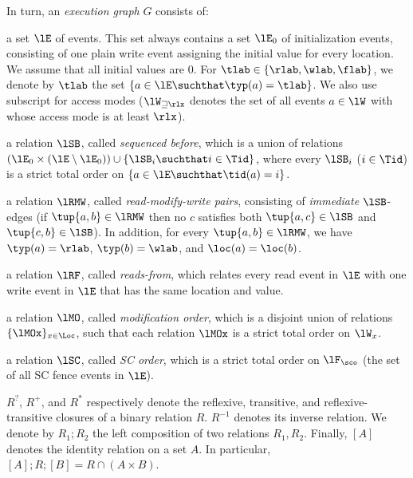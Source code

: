 In turn, an \emph{execution graph} $G$  consists of:
\squishlist
\item a set $\lE$ of events.
This set always contains a set $\lE_0$ of initialization events,
consisting of one plain write event assigning the initial value for every location.
We assume that all initial values are $0$.
For $\tlab\in\{\rlab,\wlab,\flab\}$, 
we denote by $\tlab$ the set 
$\{a\in \lE \suchthat \typ(a)=\tlab\}$.
We also %
use subscript for access modes
(\eg $\lW_{\sqsupseteq \rlx}$ denotes the set of all events $a\in \lW$ with 
whose access mode is at least $\rlx$).
\item a relation $\lSB$, called \emph{sequenced before}, 
which is a union of relations $(\lE_0\times (\lE\setminus \lE_0)) \cup \{\lSB_i \suchthat i\in\Tid\}$, 
where every $\lSB_i$ ($i\in\Tid$) is a strict total order on $\{a\in \lE \suchthat \tid(a)=i\}$.
\item  a relation $\lRMW$, called \emph{read-modify-write pairs}, consisting of 
 \emph{immediate} $\lSB$-edges
(\ie if $\tup{a,b}\in\lRMW$ then no $c$ satisfies both $\tup{a,c}\in\lSB$ and $\tup{c,b}\in\lSB$).
In addition, for every $\tup{a,b}\in\lRMW$, we have $\typ(a)=\rlab$, $\typ(b)=\wlab$, and
 $\loc(a)=\loc(b)$.
\item a relation $\lRF$, called \emph{reads-from}, which relates every read event in $\lE$
with one write event in $\lE$ that has the same location and value. 
\item a relation $\lMO$, called  \emph{modification order},
which is a disjoint union of relations $\{\lMOx\}_{x\in\Loc}$, 
such that each relation $\lMOx$ is a strict total order on $\lW_x$.
\item  a relation $\lSC$, called \emph{SC order}, which is a strict total order on $\lF_\sco$ 
(the set of all SC fence events in $\lE$).
\squishend

\begin{notation}
$R^?$, $R^+$, and $R^*$ respectively denote the reflexive, transitive, and reflexive-transitive closures of a binary relation $R$. 
$R^{-1}$ denotes its inverse relation.
We denote by $R_1;R_2$ the left composition of two relations $R_1,R_2$.
Finally, $[A]$ denotes the identity relation on a set $A$.
In particular, $[A];R;[B] = R\cap (A\times B)$.
\end{notation}

